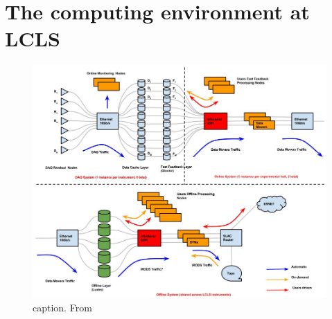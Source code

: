 \section{The computing environment at LCLS}\label{sec:LCLS-computing}
\begin{figure}
	\centering
		\includegraphics[width=1.00\textwidth]{images/daq-architecture.JPG}
	\caption{caption. From \citep{Amadeo-2016-SLAC}}
	\label{fig:daq-architecture}
\end{figure}
